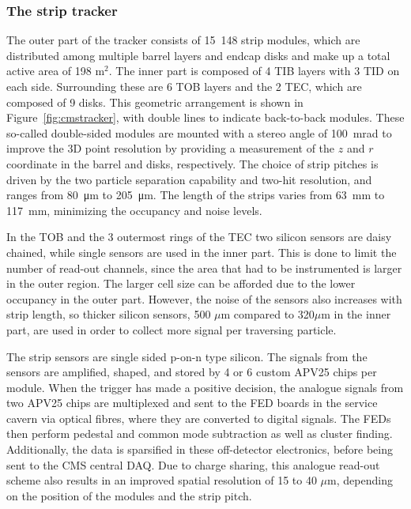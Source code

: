 \subsubsection{The strip tracker}

The outer part of the tracker consists of 15~148 strip modules, which are distributed among multiple barrel layers and endcap disks and make up a total active area of 198 m$^2$. The inner part is composed of 4 \ac{TIB} layers with 3 \ac{TID} on each side. Surrounding these are 6 \ac{TOB} layers and the 2 \ac{TEC}, which are composed of 9 disks. This geometric arrangement is shown in Figure~\ref{fig:cmstracker}, with double lines to indicate back-to-back modules. These so-called double-sided modules are mounted with a stereo angle of 100~mrad to improve the 3D point resolution by providing a measurement of the $z$ and $r$ coordinate in the barrel and disks, respectively. The choice of strip pitches is driven by the two particle separation capability and two-hit resolution, and ranges from \SI{80}{\micro m} to \SI{205}{\micro m}. The length of the strips varies from \SI{63}{mm} to \SI{117}{mm}, minimizing the occupancy and noise levels.

In the \ac{TOB} and the 3 outermost rings of the \ac{TEC} two silicon sensors are daisy chained, while single sensors are used in the inner part. This is done to limit the number of read-out channels, since the area that had to be instrumented is larger in the outer region. The larger cell size can be afforded  due to the lower occupancy in the outer part. However, the noise of the sensors also increases with strip length, so thicker silicon sensors, 500 $\mu$m compared to 320$\mu$m in the inner part, are used in order to collect more signal per traversing particle.

The strip sensors are single sided p-on-n type silicon. The signals from the sensors are amplified, shaped, and stored by 4 or 6 custom APV25 chips per module. When the trigger has made a positive decision, the analogue signals from two APV25 chips are multiplexed and sent to the \ac{FED} boards in the service cavern via optical fibres, where they are converted to digital signals. The \acp{FED} then perform pedestal and common mode subtraction as well as cluster finding. Additionally, the data is sparsified in these off-detector electronics, before being sent to the CMS central \ac{DAQ}. Due to charge sharing, this analogue read-out scheme also results in an improved spatial resolution of 15 to 40 $\mu$m, depending on the position of the modules and the strip pitch. 

